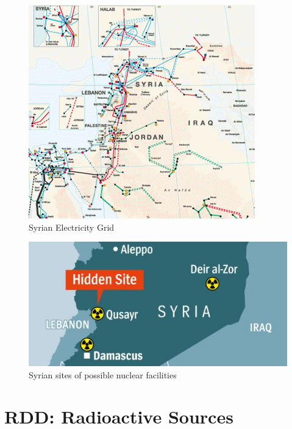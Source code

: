 \documentclass{report}
\begin{document}
\begin{figure}[H]
 \centering
 \includegraphics[trim = 0cm 0cm 0cm 0cm, clip,scale=1]{./figures/syria_grid.png}
   \caption{Syrian Electricity Grid \cite{GlobalEnergyNetworkInstitutea}}
     \label{fig:syria_grid}
\end{figure}






\begin{figure}[H]
 \centering
 \includegraphics[trim = 0cm 0cm 0cm 0cm, clip,scale=0.7]{./figures/syria_nuke_facilities.jpg}
   \caption{Syrian sites of possible nuclear facilities \cite{Follath2015}}
     \label{fig:syria_nuke_facilities}
\end{figure}










\section{RDD: Radioactive Sources}
\end{document}
